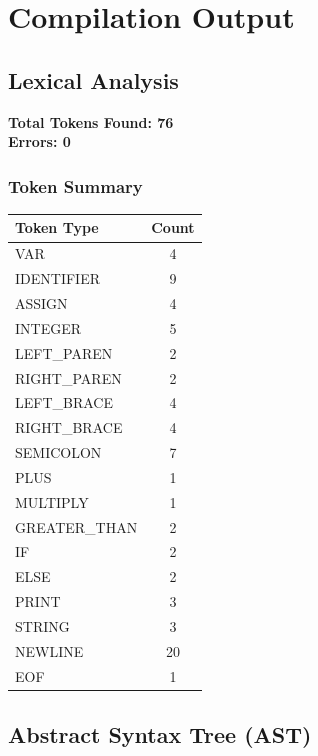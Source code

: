 \documentclass[12pt,a4paper]{report}
\begin{document}
\section{Compilation Output}

\subsection{Lexical Analysis}

\textbf{Total Tokens Found: 76}\\
\textbf{Errors: 0}

\subsubsection{Token Summary}
\begin{center}
\begin{tabular}{|l|c|}
\hline
\textbf{Token Type} & \textbf{Count} \\
\hline
VAR & 4 \\
IDENTIFIER & 9 \\
ASSIGN & 4 \\
INTEGER & 5 \\
LEFT\_PAREN & 2 \\
RIGHT\_PAREN & 2 \\
LEFT\_BRACE & 4 \\
RIGHT\_BRACE & 4 \\
SEMICOLON & 7 \\
PLUS & 1 \\
MULTIPLY & 1 \\
GREATER\_THAN & 2 \\
IF & 2 \\
ELSE & 2 \\
PRINT & 3 \\
STRING & 3 \\
NEWLINE & 20 \\
EOF & 1 \\
\hline
\end{tabular}
\end{center}

\subsection{Abstract Syntax Tree (AST)}
\end{document}
